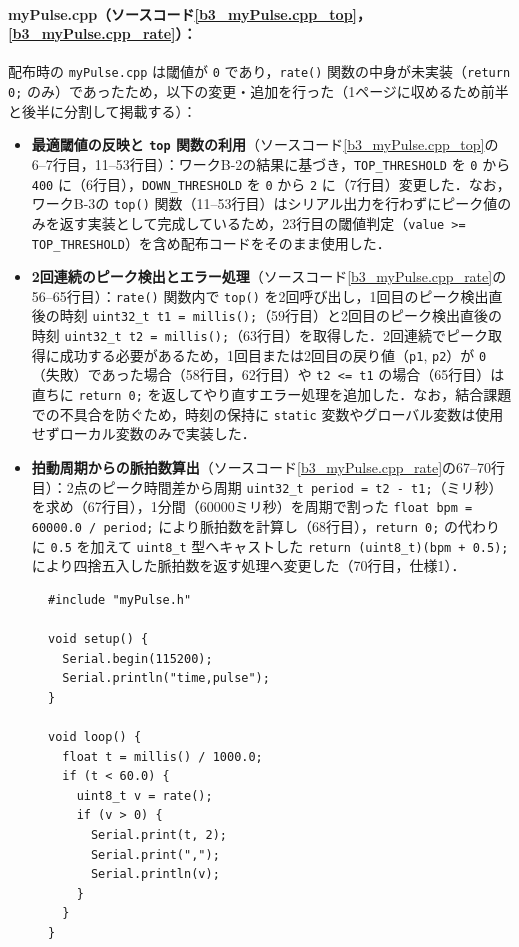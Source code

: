\paragraph{myPulse.cpp（ソースコード\ref{b3_myPulse.cpp_top}，\ref{b3_myPulse.cpp_rate}）：}
配布時の \texttt{myPulse.cpp} は閾値が \texttt{0} であり，\texttt{rate()} 関数の中身が未実装（\texttt{return 0;} のみ）であったため，以下の変更・追加を行った（1ページに収めるため前半と後半に分割して掲載する）：
\begin{itemize}
  \item \textbf{最適閾値の反映と \texttt{top} 関数の利用}（ソースコード\ref{b3_myPulse.cpp_top}の6--7行目，11--53行目）：ワークB-2の結果に基づき，\texttt{TOP\_THRESHOLD} を \texttt{0} から \texttt{400} に（6行目），\texttt{DOWN\_THRESHOLD} を \texttt{0} から \texttt{2} に（7行目）変更した．なお，ワークB-3の \texttt{top()} 関数（11--53行目）はシリアル出力を行わずにピーク値のみを返す実装として完成しているため，23行目の閾値判定（\texttt{value >= TOP\_THRESHOLD}）を含め配布コードをそのまま使用した．
  \item \textbf{2回連続のピーク検出とエラー処理}（ソースコード\ref{b3_myPulse.cpp_rate}の56--65行目）：\texttt{rate()} 関数内で \texttt{top()} を2回呼び出し，1回目のピーク検出直後の時刻 \texttt{uint32\_t t1 = millis();}（59行目）と2回目のピーク検出直後の時刻 \texttt{uint32\_t t2 = millis();}（63行目）を取得した．2回連続でピーク取得に成功する必要があるため，1回目または2回目の戻り値（\texttt{p1}, \texttt{p2}）が \texttt{0}（失敗）であった場合（58行目，62行目）や \texttt{t2 <= t1} の場合（65行目）は直ちに \texttt{return 0;} を返してやり直すエラー処理を追加した．なお，結合課題での不具合を防ぐため，時刻の保持に \texttt{static} 変数やグローバル変数は使用せずローカル変数のみで実装した．
  \item \textbf{拍動周期からの脈拍数算出}（ソースコード\ref{b3_myPulse.cpp_rate}の67--70行目）：2点のピーク時間差から周期 \texttt{uint32\_t period = t2 - t1;}（ミリ秒）を求め（67行目），1分間（60000ミリ秒）を周期で割った \texttt{float bpm = 60000.0 / period;} により脈拍数を計算し（68行目），\texttt{return 0;} の代わりに \texttt{0.5} を加えて \texttt{uint8\_t} 型へキャストした \texttt{return (uint8\_t)(bpm + 0.5);} により四捨五入した脈拍数を返す処理へ変更した（70行目，仕様1）．
\end{itemize}

\begin{figure}[H]
  \begin{lstlisting}[caption=b3\_pulse\_measurement.ino, label=b3_pulse_measurement, escapechar=\@]
#include "myPulse.h"

void setup() {
  Serial.begin(115200);
  Serial.println("time,pulse");
}

void loop() {
  float t = millis() / 1000.0;
  if (t < 60.0) {
    uint8_t v = rate();
    if (v > 0) {
      Serial.print(t, 2);
      Serial.print(",");
      Serial.println(v);
    }
  }
}
    \end{lstlisting}
\end{figure}

